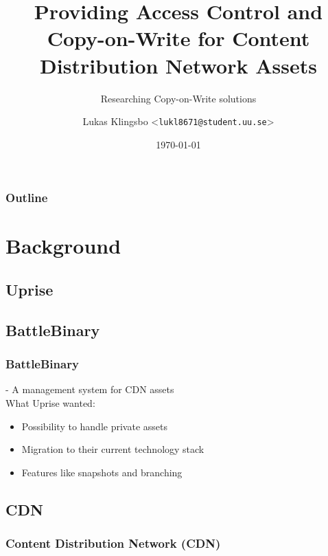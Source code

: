 \documentclass{beamer}
\title{Providing Access Control and Copy-on-Write for Content Distribution Network Assets}
\subtitle{Researching Copy-on-Write solutions}
\author[Lukas Klingsbo | \emph{lukl8671@student.uu.se}] %
{Lukas Klingsbo <\texttt{lukl8671@student.uu.se}>}
\institute[Dept.\ of Information Technology]%
{Department of Information Technology\\Uppsala University}
\date[]
{\today}
\begin{document}
\begin{frame}[plain] %
  \titlepage
\end{frame}

\begin{frame}
    \frametitle{Outline}
    \setcounter{tocdepth}{2}
    \tableofcontents[]
\end{frame}

\section{Background}

\subsection{Uprise}
\begin{frame}
  \frametitle{}
  \centerline{}
  \vspace{30pt}
  \centerline{}
  \vspace{10pt}
  \centerline{}
  \vspace{10pt}
  \centerline{}
\end{frame}

\subsection{BattleBinary}
\begin{frame}
  \frametitle{BattleBinary}
  - A management system for CDN assets\\
  What Uprise wanted:
  \begin{itemize}
    \item{Possibility to handle private assets}
    \item{Migration to their current technology stack}
    \item{Features like snapshots and branching}
  \end{itemize}
\end{frame}

\subsection{CDN}
\begin{frame}
  \frametitle{Content Distribution Network (CDN)}
  \centerline{}
\end{frame}
\end{document}
